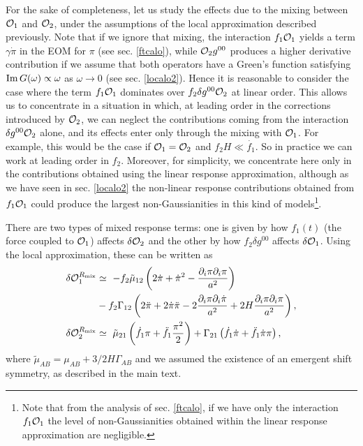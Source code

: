 \documentclass[11pt,amsmath,floats,floatfix,nofootinbib,secnumarabic, superscriptaddress, tightenlines]{revtex4}
\newcommand{\lp}{\left(}
\newcommand{\rp}{\right)}
\newcommand{\calo}{{\cal O}}
\begin{document}
{For the sake of completeness, let us study the effects due to the mixing between $\calo_1$ and $\calo_2$, under the assumptions of
the local approximation described previously.
Note that if we ignore that mixing, the interaction $f_1\calo_1$ yields a term $\gamma\dot{\pi}$ in the EOM for $\pi$  (see sec. \ref{ftcalo}), while $\calo_2 g^{00}$
produces a higher derivative contribution  if we assume that both operators have a Green's function satisfying ${\rm Im}\,G(\omega)\propto\omega$ as $\omega\rightarrow 0$ (see sec. \ref{localo2}). Hence it is reasonable to consider the case where
 the term $f_1\calo_1$ dominates over $f_2\delta g^{00}\calo_2$ at linear order. This allows us to concentrate in a situation in which, at leading order
 in the corrections introduced by  $\calo_2$, we can neglect the contributions coming from the interaction
$\delta g^{00}\calo_2$ alone, and its effects enter only through the mixing with $\calo_1$. For example, this would be the case  if $\calo_1=\calo_2$ and
$f_2 H\ll\dot{f_1}$. So in practice we can work at leading order in $f_2$. Moreover, for simplicity, we  concentrate here only in the contributions obtained
 using the linear response approximation, although
as we have seen in sec.  \ref{localo2} the non-linear response contributions obtained from $ f_1\calo_1$ could produce the largest non-Gaussianities in this kind
of models\footnote{Note that from the analysis of sec. \ref{ftcalo}, if we have only the interaction $f_1\calo_1$ the level of non-Gaussianities obtained within the linear response approximation are negligible.}.

There are two types of mixed  response terms: one is given by how $f_1(t)$ (the force coupled to $\calo_1$) affects $\delta\calo_2$
 and the other by  how $f_2\delta g^{00}$ affects $\delta\calo_1$. Using the local approximation, these can be written as
\begin{subequations}
\begin{align}
\delta\calo_1^{R_{\rm mix}}&\simeq~ -f_2\tilde{\mu}_{12}\lp 2\dot{\pi}+\dot{\pi}^2-\frac{\partial_i\pi\partial_i\pi}{a^2}\rp\nonumber\\
&-f_2\Gamma_{12}\lp2\ddot{\pi}+2\dot{\pi}\ddot{\pi}-2\frac{\partial_i\pi\partial_i\dot{\pi}}{a^2}+2H\frac{\partial_i\pi\partial_i\pi}{a^2}\rp,\\
\delta\calo_2^{R_{\rm mix}}&\simeq~ \tilde\mu_{21}\lp\dot{f_1}\pi+\ddot{f_1}\frac{\pi^2}{2}\rp+\Gamma_{21}\lp\dot{f_1} \dot{\pi}+\ddot{f_1}\dot{\pi}\pi\rp,
\end{align}
\end{subequations} where $\tilde{\mu}_{AB}={\mu}_{AB}+3/2H\Gamma_{AB}$ and we assumed the existence of an emergent shift symmetry, as described in the main text. 

}
\end{document}
